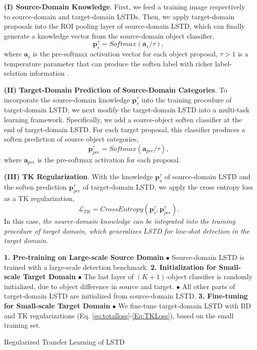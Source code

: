 \documentclass[letterpaper]{article} \usepackage{aaai18}  \usepackage{times}  \usepackage{helvet}  \usepackage{courier}  \usepackage{url}  \usepackage{graphicx}
\begin{document}
\textbf{(I) Source-Domain Knowledge}.
First,
we feed a training image respectively to source-domain and target-domain LSTDs.
Then,
we apply target-domain proposals into the ROI pooling layer of source-domain LSTD,
which can finally generate a knowledge vector from the source-domain object classifier,
\begin{equation}
\mathbf{p}_{s}^{\tau}=Softmax(\mathbf{a}_{s}/\tau),
\label{Eq:sk}
\end{equation}
where
$\mathbf{a}_{s}$ is the pre-softmax activation vector for each object proposal,
$\tau>1$ is a temperature parameter that can produce the soften label with richer label-relation information \cite{Hinton2015}.

\textbf{(II) Target-Domain Prediction of Source-Domain Categories}.
To incorporate the source-domain knowledge $\mathbf{p}_{s}^{\tau}$ into the training procedure of target-domain LSTD,
we next modify the target-domain LSTD into a multi-task learning framework.
Specifically,
we add a source-object soften classifier at the end of target-domain LSTD.
For each target proposal,
this classifier produces a soften prediction of source object categories,
\begin{equation}
\mathbf{p}_{pre}^{\tau}=Softmax(\mathbf{a}_{pre}/\tau),
\label{Eq:sp}
\end{equation}
where
$\mathbf{a}_{pre}$ is the pre-softmax activation for each proposal.

\textbf{(III) TK Regularization}.
With the knowledge $\mathbf{p}_{s}^{\tau}$ of source-domain LSTD and the soften prediction $\mathbf{p}_{pre}^{\tau}$ of target-domain LSTD,
we apply the cross entropy loss as a TK regularization,
\begin{equation}
\mathcal{L}_{TK}=CrossEntropy(\mathbf{p}_{s}^{\tau}, \mathbf{p}_{pre}^{\tau}).
\label{Eq:TKLoss}
\end{equation}
In this case,
\textit{the source-domain knowledge can be integrated into the training procedure of target domain,
which generalizes LSTD for low-shot detection in the target domain}.





\begin{algorithm}[t]
\begin{algorithmic}
   \STATE \textbf{1. Pre-training on Large-scale Source Domain}
   \STATE $\bullet$ Source-domain LSTD is trained with a large-scale detection benchmark.
   \STATE \textbf{2. Initialization for Small-scale Target Domain}
   \STATE $\bullet$ The last layer of $(K+1)$-object classifier is randomly initialized, due to object difference in source and target.
   \STATE $\bullet$ All other parts of target-domain LSTD are initialized from source-domain LSTD.
   \STATE \textbf{3. Fine-tuning for Small-scale Target Domain}
   \STATE $\bullet$ We fine-tune target-domain LSTD with BD and TK regularizations (Eq. \ref{eq:totalloss}-\ref{Eq:TKLoss}),
          based on the small training set.
\end{algorithmic}
\caption{Regularized Transfer Learning of LSTD}
\label{alg}
\end{algorithm}
\end{document}
